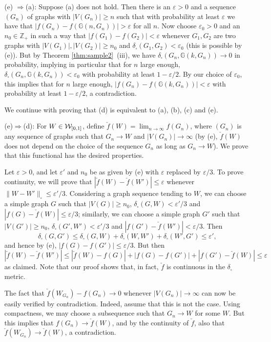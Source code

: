 \documentclass[12pt]{article}
\numberwithin{equation}{section}
\def\eps{\varepsilon}
\def\RandG{{\mathbb G}}
\def\Z{{\mathbb Z}}
\def\WWz{{\WW_{[0,1]}}}
\begin{document}
(e) $\Rightarrow$(a): Suppose (a) does not hold. Then there is an
$\eps>0$ and a sequence $(G_n)$ of graphs with $|V(G_n)|\geq n$ such
that with probability at least $\eps$ we have that
$|f(G_n)-f(\RandG(n,G_n))|>\eps$ for all $n$. Now choose $\eps_0>0$
and an $n_0\in\Z_+$ in such a way that $|f(G_1)-f(G_2)|<\eps$
whenever $G_1,G_2$ are two graphs with $|V(G_1)|,|V(G_2)|\ge n_0$ and
$\delta_\square(G_1,G_2)<\eps_0$ (this is possible by (e)). But by
Theorem \ref{thm:sample2}~(iii), we have
$\delta_\square(G_n,\RandG(k,G_n))\to 0$ in probability, implying
in particular that for $n$ large enough,
$\delta_\square(G_n,\RandG(k,G_n))<\eps_0$ with probability at
least $1-\eps/2$.  By our choice of $\eps_0$, this implies that for
$n$ large enough, $|f(G_n)-f(\RandG(k,G_n))|<\eps$  with
probability at least $1-\eps/2$, a contradiction.

\smallskip

\noindent We continue with proving that (d) is equivalent to (a),
(b), (c) and (e).

(e)$\Rightarrow$(d): For $W\in\WWz$, define
$\check{f}(W)=\lim_{n\to\infty} f(G_n)$, where $(G_n)$ is any
sequence of graphs such that $G_n\to W$ { and $|V(G_n)|\to\infty$ (by
(e), $\check{f}(W)$ does not depend on the choice of the sequence
$G_n$ as long as $G_n\to W$)}. We prove that this functional has the
desired properties.

Let $\eps>0$, and let $\eps'$ and $n_0$ be as given by (e) with
$\eps$ replaced by $\eps/3$.  To prove continuity, we will prove that
$|\check{f}(W)-\check{f}(W')|\le\eps$ whenever
$\|W-W'\|_\square\le\eps'/3$. Considering a graph sequence tending to
$W$, we can choose a simple graph $G$ such that $|V(G)|\ge n_0$,
$\delta_\square(G,W)<\eps'/3$ and $|f(G)-\check{f}(W)|\le\eps/3$;
similarly, we can choose a simple graph $G'$ such that $|V(G')|\ge
n_0$, $\delta_\square(G',W')<\eps'/3$ and
$|f(G')-\check{f}(W')|<\eps/3$. Then
\[
\delta_\square(G,G')\le\delta_\square(G,W)+\delta_\square(W,W')+
\delta_\square(W',G')\le \eps',
\]
and hence by (e), $|f(G)-f(G')|\le\eps/3$. But then
\[
|\check{f}(W)-\check{f}(W')|\le
|\check{f}(W)-f(G)|+|f(G)-f(G')|+|f(G')-\check{f}(W)|\le \eps
\]
as claimed.  Note that our proof shows that, in fact, $\check{f}$ is
continuous in the $\delta_\square$ metric.

The fact that $\check{f}(W_{G_n})-f(G_n)\to 0$ whenever
$|V(G_n)|\to\infty$ can now be easily verified by contradiction.
Indeed, assume that this is not the case.  Using compactness, we may
choose a subsequence such that $G_n\to W$ for some $W$.  But this
implies that $f(G_n)\to\check{f}(W)$, and by the continuity of
$\check f$, also that $\check{f}(W_{G_n})\to \check{f}(W)$, a
contradiction.
\end{document}
